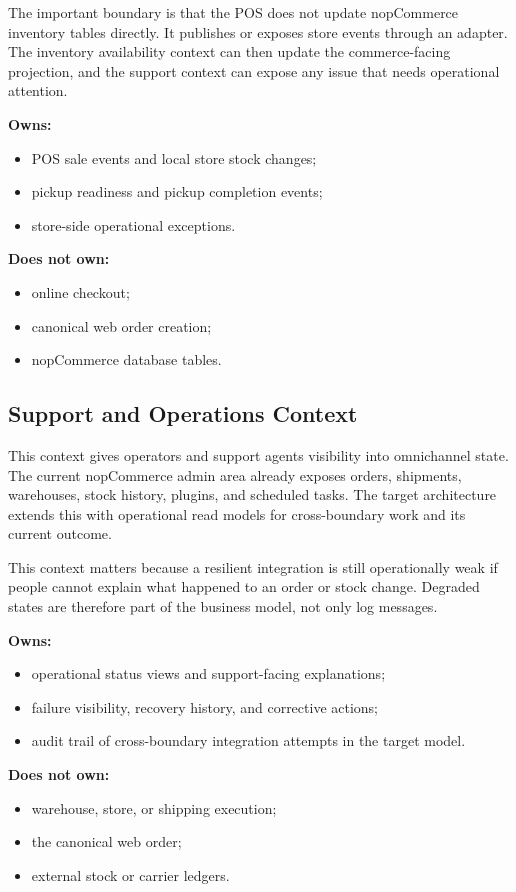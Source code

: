 The important boundary is that the POS does not update nopCommerce inventory tables directly.
It publishes or exposes store events through an adapter. The inventory availability context can
then update the commerce-facing projection, and the support context can expose any issue that
needs operational attention.

\textbf{Owns:}
\begin{itemize}
    \item POS sale events and local store stock changes;
    \item pickup readiness and pickup completion events;
    \item store-side operational exceptions.
\end{itemize}

\textbf{Does not own:}
\begin{itemize}
    \item online checkout;
    \item canonical web order creation;
    \item nopCommerce database tables.
\end{itemize}

\subsection{Support and Operations Context}

This context gives operators and support agents visibility into omnichannel state. The current
nopCommerce admin area already exposes orders, shipments, warehouses, stock history, plugins,
and scheduled tasks. The target architecture extends this with operational read models for
cross-boundary work and its current outcome.

This context matters because a resilient integration is still operationally weak if people
cannot explain what happened to an order or stock change. Degraded states are therefore part of
the business model, not only log messages.

\textbf{Owns:}
\begin{itemize}
    \item operational status views and support-facing explanations;
    \item failure visibility, recovery history, and corrective actions;
    \item audit trail of cross-boundary integration attempts in the target model.
\end{itemize}

\textbf{Does not own:}
\begin{itemize}
    \item warehouse, store, or shipping execution;
    \item the canonical web order;
    \item external stock or carrier ledgers.
\end{itemize}

